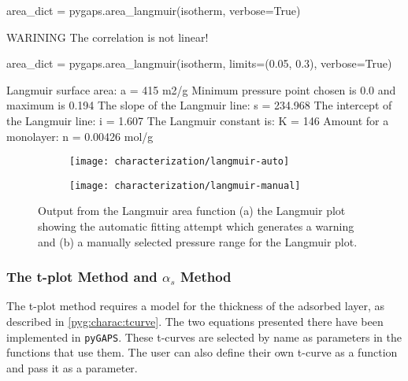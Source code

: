\begin{samepage}
	\begin{python}[caption={Calculating a Langmuir area},label={pyg:lst:langmuirarea}]
area_dict = pygaps.area_langmuir(isotherm, verbose=True)
\end{python}
	\begin{pythonout}
WARINING The correlation is not linear!
\end{pythonout}
	\begin{python}
area_dict = pygaps.area_langmuir(isotherm, 
                                 limits=(0.05, 0.3), 
                                 verbose=True)
\end{python}
	\begin{pythonout}
Langmuir surface area: 	a = 415 m2/g
Minimum pressure point chosen is 0.0 and maximum is 0.194
The slope of the Langmuir line: 		s = 234.968
The intercept of the Langmuir line: 	i = 1.607
The Langmuir constant is:				K = 146
Amount for a monolayer: 				n = 0.00426 mol/g
\end{pythonout}
\end{samepage}

\begin{figure}[!htb]
	\centering

	\begin{subfigure}{0.45\linewidth}
		\parbox[c]{0.1\linewidth}{\caption{}%
			\label{pyg:fig:langmuirarea-auto}}
		\parbox[b]{0.85\linewidth}{%
			\texttt{[image: characterization/langmuir-auto]}}
	\end{subfigure}%
	\begin{subfigure}{0.45\linewidth}
		\parbox[c]{0.1\linewidth}{\caption{}%
			\label{pyg:fig:langmuirarea-manual}}
		\parbox[b]{0.85\linewidth}{%
			\texttt{[image: characterization/langmuir-manual]}}
	\end{subfigure}%

	\caption{Output from the Langmuir area function (a) the Langmuir plot
		showing the automatic fitting attempt which generates a warning and (b) a manually
		selected pressure range for the Langmuir plot.}%
	\label{pyg:fig:langmuirarea}

\end{figure}

\subsubsection{The t-plot Method and \(\alpha_s\) Method}

The t-plot method requires a model for the thickness of 
the adsorbed layer, as described in \autoref{pyg:charac:tcurve}.
The two equations presented there have been implemented in \texttt{pyGAPS}.
These t-curves are selected by name as parameters in
the functions that use them. The user can also define their
own t-curve as a function and pass it as a parameter.

